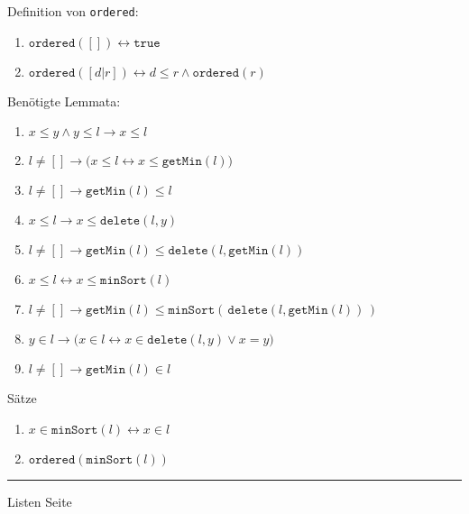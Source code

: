 
\begin{slide}{}
\normalsize

\begin{center}

\end{center}
\vspace*{0.5cm}

\footnotesize
Definition von \texttt{ordered}:
\begin{enumerate}
\item $\mathtt{ordered}([]) \leftrightarrow \mathtt{true}$
\item $\mathtt{ordered}([d|r]) \leftrightarrow d \leq r \wedge \mathtt{ordered}(r)$
\end{enumerate}

Ben\"otigte Lemmata:
\begin{enumerate}
\item $x \leq y \wedge y \leq l \rightarrow x \leq l$
\item $l \not= [] \rightarrow \bigg(x \leq l \leftrightarrow x \leq \mathtt{getMin}(l)\bigg)$
\item $l \not = [] \rightarrow \mathtt{getMin}(l) \leq l$
\item $x \leq l \rightarrow x \leq \mathtt{delete}(l,y)$
\item $l \not= [] \rightarrow \mathtt{getMin}(l) \leq \mathtt{delete}(l, \mathtt{getMin}(l))$
\item $x \leq l \leftrightarrow x \leq \mathtt{minSort}(l)$
\item $l \not= [] \rightarrow \mathtt{getMin}(l) \leq \mathtt{minSort}(\,\mathtt{delete}(l, \mathtt{getMin}(l))\,)$
\item $y \in l \rightarrow \bigg(x \in l \leftrightarrow x \in \mathtt{delete}(l,y) \vee x = y \bigg)$
\item $l \not= [] \rightarrow \mathtt{getMin}(l) \in l$
\end{enumerate}

S\"atze
\begin{enumerate}
\item $x \in \mathtt{minSort}(l) \leftrightarrow x \in l$
\item $\mathtt{ordered}(\mathtt{minSort}(l))$
\end{enumerate}

\vspace*{\fill}
\tiny \addtocounter{mypage}{1}
\rule{17cm}{1mm}
Listen  \hspace*{\fill} Seite 
\end{slide}


